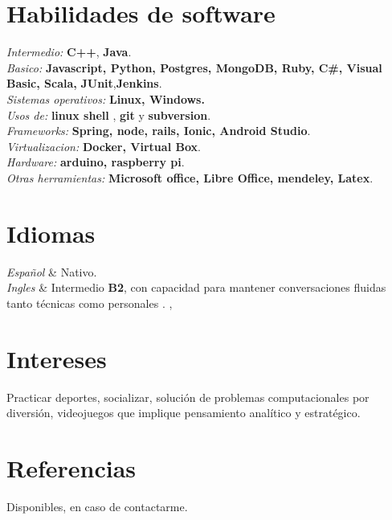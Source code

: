 \documentclass[
    changecolor={111, 156, 45}, 
]{cv-roald}
\begin{document}
\section*{Habilidades de software}
	\textit{Intermedio:}  \textbf{C++}, \textbf{Java}.\\
	\textit{Basico:} \textbf{Javascript, Python, Postgres, MongoDB, Ruby, C\#, Visual Basic, Scala,}  \textbf{JUnit},\textbf{Jenkins}.\\
	\textit{Sistemas operativos:} \textbf{Linux, Windows.}\\
	\textit{Usos de:} \textbf{linux shell} , \textbf{git} y \textbf{subversion}.\\
	\textit{Frameworks:} \textbf{Spring, node, rails, Ionic, Android Studio}. \\
	\textit{Virtualizacion:} \textbf{Docker, Virtual Box}.\\
	\textit{Hardware:} \textbf{arduino, raspberry pi}.\\
	\textit{Otras herramientas:} \textbf{Microsoft office, Libre Office, mendeley, Latex}.

\section*{Idiomas}
\begin{tabularcv}
\textit{Español}     &	Nativo. \\
\textit{Ingles}      &  Intermedio \textbf{B2}, con capacidad para mantener conversaciones fluidas tanto técnicas como personales . ,\\
\end{tabularcv}

\section*{Intereses}
Practicar deportes, socializar, solución de problemas computacionales por diversión, videojuegos que implique pensamiento analítico y estratégico.

\section*{Referencias}
Disponibles, en caso de contactarme.
    
\end{document}
